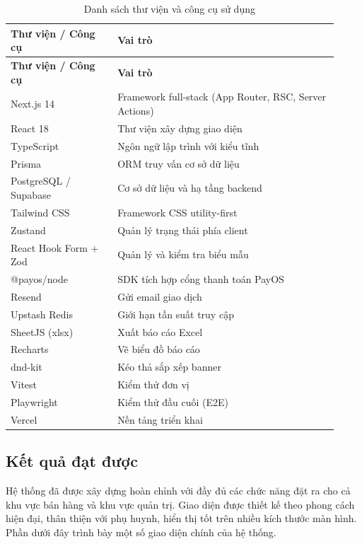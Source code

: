 \begin{longtable}{|>{\raggedright\arraybackslash}p{0.30\linewidth}|>{\raggedright\arraybackslash}p{0.62\linewidth}|}
\caption{Danh sách thư viện và công cụ sử dụng}\label{tab:libs}\\
\hline
\rowcolor{gray!12}\textbf{Thư viện / Công cụ} & \textbf{Vai trò} \\ \hline
\endfirsthead
\hline
\rowcolor{gray!12}\textbf{Thư viện / Công cụ} & \textbf{Vai trò} \\ \hline
\endhead
Next.js 14 & Framework full-stack (App Router, RSC, Server Actions) \\ \hline
React 18 & Thư viện xây dựng giao diện \\ \hline
TypeScript & Ngôn ngữ lập trình với kiểu tĩnh \\ \hline
Prisma & ORM truy vấn cơ sở dữ liệu \\ \hline
PostgreSQL / Supabase & Cơ sở dữ liệu và hạ tầng backend \\ \hline
Tailwind CSS & Framework CSS utility-first \\ \hline
Zustand & Quản lý trạng thái phía client \\ \hline
React Hook Form + Zod & Quản lý và kiểm tra biểu mẫu \\ \hline
@payos/node & SDK tích hợp cổng thanh toán PayOS \\ \hline
Resend & Gửi email giao dịch \\ \hline
Upstash Redis & Giới hạn tần suất truy cập \\ \hline
SheetJS (xlsx) & Xuất báo cáo Excel \\ \hline
Recharts & Vẽ biểu đồ báo cáo \\ \hline
dnd-kit & Kéo thả sắp xếp banner \\ \hline
Vitest & Kiểm thử đơn vị \\ \hline
Playwright & Kiểm thử đầu cuối (E2E) \\ \hline
Vercel & Nền tảng triển khai \\ \hline
\end{longtable}

\subsection{Kết quả đạt được}

Hệ thống đã được xây dựng hoàn chỉnh với đầy đủ các chức năng đặt ra cho cả khu vực bán hàng
và khu vực quản trị. Giao diện được thiết kế theo phong cách hiện đại, thân thiện với phụ huynh,
hiển thị tốt trên nhiều kích thước màn hình. Phần dưới đây trình bày một số giao diện chính của
hệ thống.

